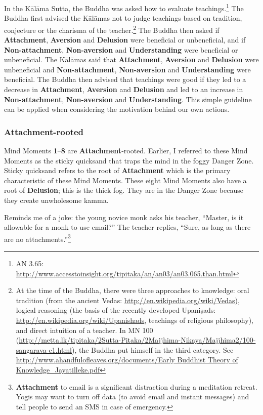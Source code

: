 \pagebreak

In the Kālāma Sutta, the Buddha was asked how to evaluate teachings.\footnote{AN 3.65: \url{http://www.accesstoinsight.org/tipitaka/an/an03/an03.065.than.html}} The Buddha first advised the Kālāmas not to judge teachings based on tradition, conjecture or the charisma of the teacher.\footnote{At the time of the Buddha, there were three approaches to knowledge: oral tradition (from the ancient Vedas: \url{http://en.wikipedia.org/wiki/Vedas}), logical reasoning (the basis of the recently-developed Upaniṣads: \url{http://en.wikipedia.org/wiki/Upanishads}, teachings of religious philosophy), and direct intuition of a teacher. In MN 100 (\url{http://metta.lk/tipitaka/2Sutta-Pitaka/2Majjhima-Nikaya/Majjhima2/100-sangarava-e1.html}), the Buddha put himself in the third category. See \url{http://www.ahandfulofleaves.org/documents/Early Buddhist Theory of Knowledge_Jayatilleke.pdf}} The Buddha then asked if \textbf{Attachment}, \textbf{Aversion} and \textbf{Delusion} were beneficial or unbeneficial, and if \textbf{Non-attachment}, \textbf{Non-aversion} and \textbf{Understanding} were beneficial or unbeneficial. The Kālāmas said that \textbf{Attachment}, \textbf{Aversion} and \textbf{Delusion} were unbeneficial and \textbf{Non-attachment}, \textbf{Non-aversion} and \textbf{Understanding} were beneficial. The Buddha then advised that teachings were good if they led to a decrease in \textbf{Attachment}, \textbf{Aversion} and \textbf{Delusion} and led to an increase in \textbf{Non-attachment}, \textbf{Non-aversion} and \textbf{Understanding}. This simple guideline can be applied when considering the motivation behind our own actions.

\subsubsection*{\textbf{Attachment}-rooted}

Mind Moments \textbf{1}--\textbf{8} are \textbf{Attachment}-rooted. Earlier, I referred to these Mind Moments as the sticky quicksand that traps the mind in the foggy Danger Zone. Sticky quicksand refers to the root of \textbf{Attachment} which is the primary characteristic of these Mind Moments. These eight Mind Moments also have a root of \textbf{Delusion}; this is the thick fog. They are in the Danger Zone because they create unwholesome kamma.

Reminds me of a joke: the young novice monk asks his teacher, “Master, is it allowable for a monk to use email?” The teacher replies, “Sure, as long as there are no attachments.”\footnote{\textbf{Attachment} to email is a significant distraction during a meditation retreat. Yogis may want to turn off data (to avoid email and instant messages) and tell people to send an SMS in case of emergency.}

